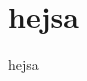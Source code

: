 \documentclass[12pt]{article}
\begin{document}

    \tableofcontents
    \newpage

    \section{hejsa}
        hejsa \cite{ringLWE}

    \newpage
    \printbibliography
\end{document}
